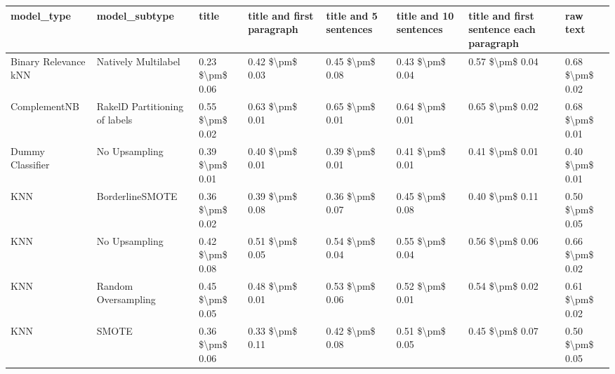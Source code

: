 \begin{tabular}{llllllll}
\toprule
                     model\_type &                 model\_subtype &           title & title and first paragraph & title and 5 sentences & title and 10 sentences & title and first sentence each paragraph &        raw text \\
\midrule
           Binary Relevance kNN &           Natively Multilabel & 0.23 \$\textbackslash pm\$ 0.06 &           0.42 \$\textbackslash pm\$ 0.03 &       0.45 \$\textbackslash pm\$ 0.08 &        0.43 \$\textbackslash pm\$ 0.04 &                         0.57 \$\textbackslash pm\$ 0.04 & 0.68 \$\textbackslash pm\$ 0.02 \\
                   ComplementNB & RakelD Partitioning of labels & 0.55 \$\textbackslash pm\$ 0.02 &           0.63 \$\textbackslash pm\$ 0.01 &       0.65 \$\textbackslash pm\$ 0.01 &        0.64 \$\textbackslash pm\$ 0.01 &                         0.65 \$\textbackslash pm\$ 0.02 & 0.68 \$\textbackslash pm\$ 0.01 \\
               Dummy Classifier &                 No Upsampling & 0.39 \$\textbackslash pm\$ 0.01 &           0.40 \$\textbackslash pm\$ 0.01 &       0.39 \$\textbackslash pm\$ 0.01 &        0.41 \$\textbackslash pm\$ 0.01 &                         0.41 \$\textbackslash pm\$ 0.01 & 0.40 \$\textbackslash pm\$ 0.01 \\
                            KNN &               BorderlineSMOTE & 0.36 \$\textbackslash pm\$ 0.02 &           0.39 \$\textbackslash pm\$ 0.08 &       0.36 \$\textbackslash pm\$ 0.07 &        0.45 \$\textbackslash pm\$ 0.08 &                         0.40 \$\textbackslash pm\$ 0.11 & 0.50 \$\textbackslash pm\$ 0.05 \\
                            KNN &                 No Upsampling & 0.42 \$\textbackslash pm\$ 0.08 &           0.51 \$\textbackslash pm\$ 0.05 &       0.54 \$\textbackslash pm\$ 0.04 &        0.55 \$\textbackslash pm\$ 0.04 &                         0.56 \$\textbackslash pm\$ 0.06 & 0.66 \$\textbackslash pm\$ 0.02 \\
                            KNN &           Random Oversampling & 0.45 \$\textbackslash pm\$ 0.05 &           0.48 \$\textbackslash pm\$ 0.01 &       0.53 \$\textbackslash pm\$ 0.06 &        0.52 \$\textbackslash pm\$ 0.01 &                         0.54 \$\textbackslash pm\$ 0.02 & 0.61 \$\textbackslash pm\$ 0.02 \\
                            KNN &                         SMOTE & 0.36 \$\textbackslash pm\$ 0.06 &           0.33 \$\textbackslash pm\$ 0.11 &       0.42 \$\textbackslash pm\$ 0.08 &        0.51 \$\textbackslash pm\$ 0.05 &                         0.45 \$\textbackslash pm\$ 0.07 & 0.50 \$\textbackslash pm\$ 0.05 \\

\end{tabular}
